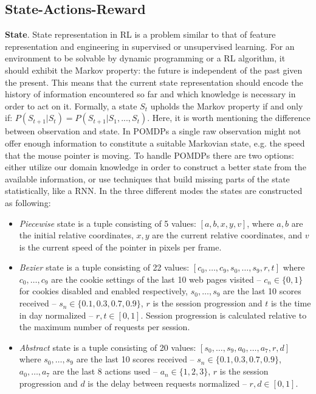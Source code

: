 \subsection{State-Actions-Reward}
\textbf{State}. State representation in \gls{RL} is a problem similar to that of feature representation and engineering in supervised or unsupervised learning.
For an environment to be solvable by dynamic programming or a \gls{RL} algorithm, it should exhibit the Markov property: the future is independent of the past given the present.
This means that the current state representation should encode the history of information encountered so far and which knowledge is necessary in order to act on it.
Formally, a state $S_t$ upholds the Markov property if and only if: $P(S_{t+1} | S_t) = P(S_{t+1} | S_1,..., S_t)$.
Here, it is worth mentioning the difference between observation and state.
In POMDPs a single raw observation might not offer enough information to constitute a suitable Markovian state, e.g. the speed that the mouse pointer is moving.
To handle POMDPs there are two options: either utilize our domain knowledge in order to construct a better state from the available information, or use techniques that build missing parts of the state statistically, like a \gls{RNN}.
In the three different modes the states are constructed as following:

\begin{itemize}
\item \emph{Piecewise} state is a tuple consisting of 5 values: $[a,b,x,y,v]$, where $a,b$ are the initial relative coordinates, $x,y$ are the current relative coordinates, and $v$ is the current speed of the pointer in pixels per frame.
\item \emph{Bezier} state is a tuple consisting of 22 values: $[c_0,\dots,c_9,s_0,\dots,s_9, r, t]$ where $c_0,\dots,c_9$ are the cookie settings of the last 10 web pages visited -- $c_n \in \{0,1\}$ for cookies disabled and enabled respectively, $s_0,\dots,s_9$ are the last 10 scores received -- $s_n \in \{0.1,0.3,0.7,0.9\}$, $r$ is the session progression and $t$ is the time in day normalized -- $r,t \in [0,1]$.
Session progression is calculated relative to the maximum number of requests per session.
\item \emph{Abstract} state is a tuple consisting of 20 values: $[s_0,\dots,s_9,a_0,\dots,a_7,r,d]$ where $s_0,\dots,s_9$ are the last 10 scores received -- $s_n \in \{0.1,0.3,0.7,0.9\}$, $a_0,\dots,a_7$ are the last 8 actions used -- $a_n \in \{1,2,3\}$, $r$ is the session progression and $d$ is the delay between requests normalized -- $r,d \in [0,1]$.
\end{itemize}

